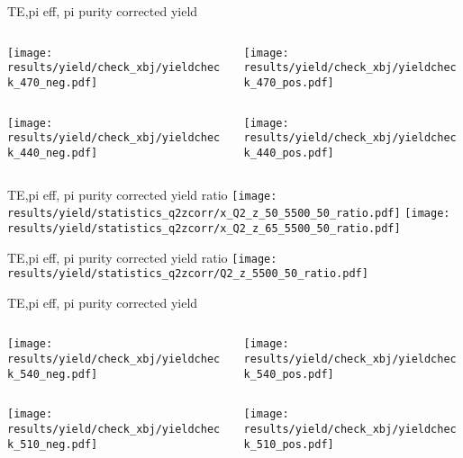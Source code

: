 \begin{frame}{TE,pi eff, pi purity corrected yield}
\begin{columns}
\begin{column}[T]{0.5\textwidth}
\texttt{[image: results/yield/check\_xbj/yieldcheck\_470\_neg.pdf]}
\end{column}
\begin{column}[T]{0.5\textwidth}
\texttt{[image: results/yield/check\_xbj/yieldcheck\_470\_pos.pdf]}
\end{column}
\end{columns}
\begin{columns}
\begin{column}[T]{0.5\textwidth}
\texttt{[image: results/yield/check\_xbj/yieldcheck\_440\_neg.pdf]}
\end{column}
\begin{column}[T]{0.5\textwidth}
\texttt{[image: results/yield/check\_xbj/yieldcheck\_440\_pos.pdf]}
\end{column}
\end{columns}
\end{frame}
\begin{frame}{TE,pi eff, pi purity corrected yield ratio}
\texttt{[image: results/yield/statistics\_q2zcorr/x\_Q2\_z\_50\_5500\_50\_ratio.pdf]}
\texttt{[image: results/yield/statistics\_q2zcorr/x\_Q2\_z\_65\_5500\_50\_ratio.pdf]}
\end{frame}
\begin{frame}{TE,pi eff, pi purity corrected yield ratio}
\texttt{[image: results/yield/statistics\_q2zcorr/Q2\_z\_5500\_50\_ratio.pdf]}
\end{frame}
\begin{frame}{TE,pi eff, pi purity corrected yield}
\begin{columns}
\begin{column}[T]{0.5\textwidth}
\texttt{[image: results/yield/check\_xbj/yieldcheck\_540\_neg.pdf]}
\end{column}
\begin{column}[T]{0.5\textwidth}
\texttt{[image: results/yield/check\_xbj/yieldcheck\_540\_pos.pdf]}
\end{column}
\end{columns}
\begin{columns}
\begin{column}[T]{0.5\textwidth}
\texttt{[image: results/yield/check\_xbj/yieldcheck\_510\_neg.pdf]}
\end{column}
\begin{column}[T]{0.5\textwidth}
\texttt{[image: results/yield/check\_xbj/yieldcheck\_510\_pos.pdf]}
\end{column}
\end{columns}
\end{frame}
